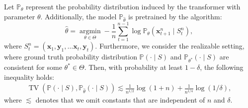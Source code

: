  \begin{lemma}\citep{zhang2023and}\label{lemma_TV_trans} Let $\mathbb{P}_\theta$ represent the probability distribution induced by the transformer with parameter $\theta$. Additionally, the model $\mathbb{P}_{\hat{\theta}}$ is pretrained by the algorithm:
$$
\hat{\theta}=\underset{\theta \in \Theta}{\operatorname{argmin}}-\frac{1}{n} \sum_{t=1}^{n-1} \log \mathbb{P}_\theta\left(\boldsymbol{x}_{t+1}^n \mid S_t^n\right),
$$
where $S_t^n=\left(\boldsymbol{x}_1, \boldsymbol{y}_1, \ldots \boldsymbol{x}_{t}, \boldsymbol{y}_{t}\right)$. Furthermore, we consider the realizable setting, where ground truth probability distribution $\mathbb{P}(\cdot \mid S)$ and $\mathbb{P}_{\theta^*}(\cdot \mid S)$ are consistent for some $\theta^* \in \Theta$. Then, with probability at least $1-\delta$, the following inequality holds:
\begin{align}
\operatorname{TV}\left(\mathbb{P}(\cdot \mid S), \mathbb{P}_{\hat{\theta}}(\cdot \mid S)\right) \lesssim \frac{1}{n^{1/2}}\log (1+n)+\frac{1}{n^{1/4}}\log (1/\delta),
\end{align}
where $\lesssim$ denotes that we omit constants that are independent of $n$ and $\delta$.
 \end{lemma}


